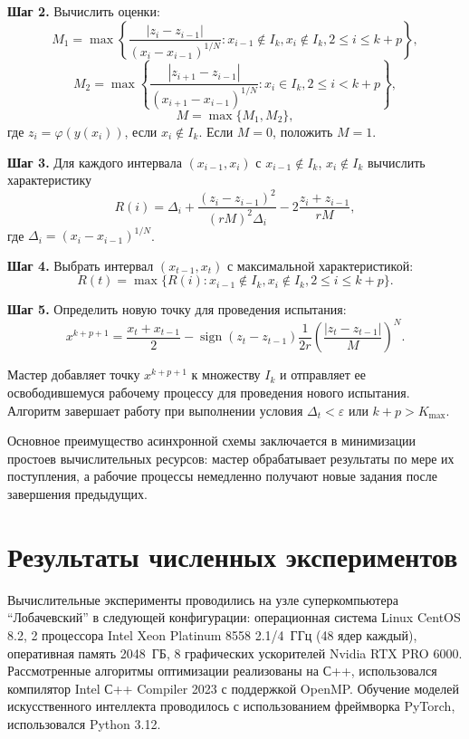 \documentclass[10pt,a4paper]{book}
\begin{document}
\textbf{Шаг 2.} Вычислить оценки:
\[
M_1 = \max\left\{ \frac{|z_i - z_{i-1}|}{(x_i - x_{i-1})^{1/N}} : x_{i-1} \notin I_k, x_i \notin I_k, 2 \leqslant i \leqslant k+p \right\},
\]
\[
M_2 = \max\left\{ \frac{|z_{i+1} - z_{i-1}|}{(x_{i+1} - x_{i-1})^{1/N}} : x_i \in I_k, 2 \leqslant i < k+p \right\},
\]
\[
M = \max\{M_1, M_2\},
\]
где $z_i = \varphi(y(x_i))$, если $x_i \notin I_k$. Если $M = 0$, положить $M = 1$.

\textbf{Шаг 3.} Для каждого интервала $(x_{i-1}, x_i)$ с $x_{i-1} \notin I_k$, $x_i \notin I_k$ вычислить характеристику
\[
R(i) = \Delta_i + \frac{(z_i - z_{i-1})^2}{(rM)^2\Delta_i} - 2\frac{z_i + z_{i-1}}{rM},
\]
где $\Delta_i = (x_i - x_{i-1})^{1/N}$.

\textbf{Шаг 4.} Выбрать интервал $(x_{t-1}, x_t)$ с максимальной характеристикой:
\[
R(t) = \max\{ R(i) : x_{i-1} \notin I_k, x_i \notin I_k, 2 \leqslant i \leqslant k+p \}.
\]

\textbf{Шаг 5.} Определить новую точку для проведения испытания:
\[
x^{k+p+1} = \frac{x_t + x_{t-1}}{2} - \operatorname{sign}(z_t - z_{t-1}) \frac{1}{2r} \left( \frac{|z_t - z_{t-1}|}{M} \right)^N.
\]

Мастер добавляет точку $x^{k+p+1}$ к множеству $I_k$ и отправляет ее освободившемуся рабочему процессу для проведения нового испытания. Алгоритм завершает работу при выполнении условия $\Delta_t < \varepsilon$ или $k+p > K_{\max}$.

Основное преимущество асинхронной схемы заключается в минимизации простоев вычислительных ресурсов: мастер обрабатывает результаты по мере их поступления, а рабочие процессы немедленно получают новые задания после завершения предыдущих.

\section{Результаты численных экспериментов}
\label{sec-result}

Вычислительные эксперименты проводились на узле суперкомпьютера ``Лобачевский'' в следующей конфигурации: операционная система Linux CentOS 8.2, 2 процессора Intel Xeon Platinum 8558 2.1/4~ГГц (48 ядер каждый), оперативная память 2048~ГБ, 8 графических ускорителей Nvidia RTX PRO 6000. Рассмотренные алгоритмы оптимизации реализованы на С++, использовался компилятор Intel С++ Compiler 2023 с поддержкой OpenMP. Обучение моделей искусственного интеллекта проводилось с использованием фреймворка PyTorch, использовался Python 3.12.
\end{document}
